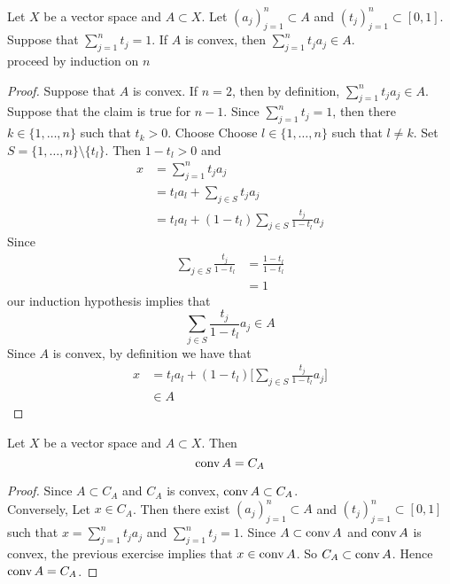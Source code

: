\documentclass{book}
\begin{document}
	\begin{ex}
		Let $X$ be a vector space and $A \subset X$. Let $(a_j)_{j=1}^n \subset A$ and $(t_j)_{j=1}^n \subset [0,1]$. Suppose that $\sum\limits_{j=1}^n t_j = 1$. If $A$ is convex, then $\sum\limits_{j=1}^n t_ja_j \in A$.\\
		 proceed by induction on $n$
	\end{ex}
	

	\begin{proof}
		Suppose that $A$ is convex. If $n = 2$, then by definition, $\sum\limits_{j=1}^n t_ja_j \in A$. \\
		Suppose that the claim is true for $n - 1$. Since $\sum\limits_{j=1}^n t_j = 1$, then there $k \in \{1, \ldots, n\}$ such that $t_k > 0$. Choose Choose $l \in \{1, \ldots, n\}$ such that $l \neq k$. Set $S = \{1, \ldots, n\} \setminus \{t_l\}$. Then $1 - t_l >0$ and  
		\begin{align*}
			x
			&= \sum\limits_{j=1}^n t_j a_j \\
			&= t_l a_l + \sum_{j \in S} t_ja_j \\
			&= t_la_l + (1-t_l) \sum_{j \in S} \frac{t_j}{1 - t_l}a_j
		\end{align*}
		Since 
		\begin{align*}
			\sum_{j \in S} \frac{t_j}{1-t_l} 
			&= \frac{1-t_l}{1-t_l} \\
			&= 1
		\end{align*}
		our induction hypothesis implies that 
		$$\sum\limits_{j \in S} \frac{t_j}{1-t_l} a_j \in A$$ 
		Since $A$ is convex, by definition we have that 
		\begin{align*}
			x 
			&= t_la_l + (1-t_l) \bigg[ \sum_{j \in S} \frac{t_j}{1 - t_l}a_j \bigg] \\
			& \in A
		\end{align*}
	\end{proof}

	\begin{ex}
		Let $X$ be a vector space and $A \subset X$. Then 
		$$\operatorname{conv} A = C_A$$
	\end{ex}

	\begin{proof}
	Since $A \subset C_A$ and $C_A$ is convex, $\operatorname{conv} A \subset C_A$. \\
	Conversely, Let $x \in C_A$. Then there exist $(a_j)_{j=1}^n \subset A$ and $(t_j)_{j=1}^n \subset [0,1]$ such that $x = \sum\limits_{j=1}^n t_j a_j$ and $\sum\limits_{j=1}^n t_j = 1$. Since $A \subset \operatorname{conv} A$ and $\operatorname{conv} A$ is convex, the previous exercise implies that $x \in \operatorname{conv} A$. So $C_A \subset \operatorname{conv} A$. Hence $\operatorname{conv} A = C_A$.
	\end{proof}
\end{document}
